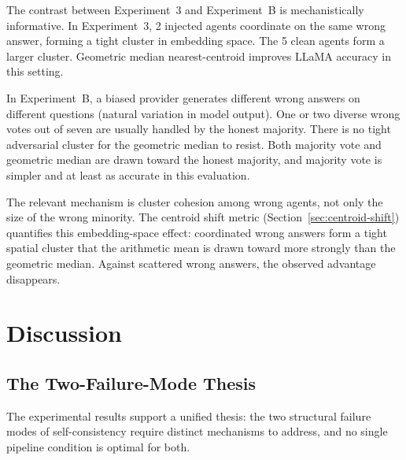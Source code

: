 \documentclass[11pt]{article}
\begin{document}
The contrast between Experiment~3 and Experiment~B is mechanistically
informative. In Experiment~3, 2 injected agents coordinate on the same wrong
answer, forming a tight cluster in embedding space. The 5 clean agents form a
larger cluster. Geometric median nearest-centroid improves LLaMA accuracy in
this setting.

In Experiment~B, a biased provider generates different wrong answers on different
questions (natural variation in model output). One or two diverse wrong votes
out of seven are usually handled by the honest majority. There is no tight
adversarial cluster for the geometric median to resist. Both majority vote and
geometric median are drawn toward the honest majority, and majority vote is
simpler and at least as accurate in this evaluation.

The relevant mechanism is cluster cohesion among wrong agents, not only the size
of the wrong minority. The centroid shift metric (Section~\ref{sec:centroid-shift})
quantifies this embedding-space effect: coordinated wrong answers form a tight
spatial cluster that the arithmetic mean is drawn toward more strongly than the
geometric median. Against scattered wrong answers, the observed advantage
disappears.

\section{Discussion}
\label{sec:discussion}

\subsection{The Two-Failure-Mode Thesis}
\label{sec:thesis}

The experimental results support a unified thesis: the two structural failure
modes of self-consistency require distinct mechanisms to address, and no single
pipeline condition is optimal for both.
\end{document}
